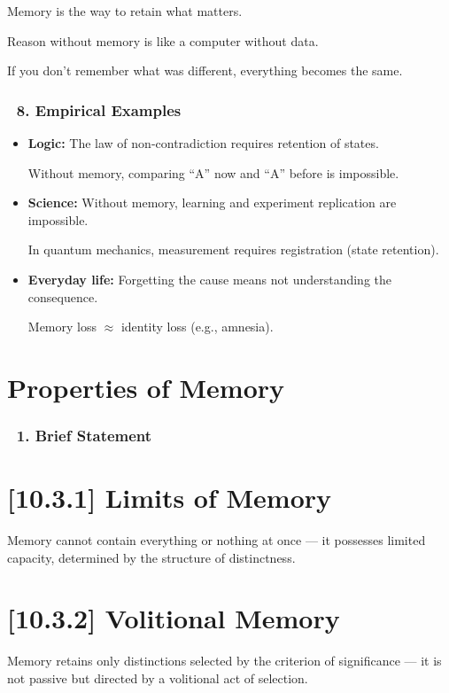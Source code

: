 \documentclass[12pt]{article}
\begin{document}
Memory is the way to retain what matters.

Reason without memory is like a computer without data.

If you don’t remember what was different, everything becomes the same.

\subsubsection*{🔹 8. Empirical Examples}
\begin{itemize}
\item \textbf{Logic:}
The law of non-contradiction requires retention of states.

Without memory, comparing ``A'' now and ``A'' before is impossible.

\item \textbf{Science:}
Without memory, learning and experiment replication are impossible.

In quantum mechanics, measurement requires registration (state retention).

\item \textbf{Everyday life:}
Forgetting the cause means not understanding the consequence.

Memory loss $\approx$ identity loss (e.g., amnesia).
\end{itemize}

\section*{Properties of Memory}

\subsubsection*{🔹 1. Brief Statement}

\section*{[10.3.1] Limits of Memory}

Memory cannot contain everything or nothing at once — it possesses limited capacity, determined by the structure of distinctness.

\section*{[10.3.2] Volitional Memory}

Memory retains only distinctions selected by the criterion of significance — it is not passive but directed by a volitional act of selection.
\end{document}

